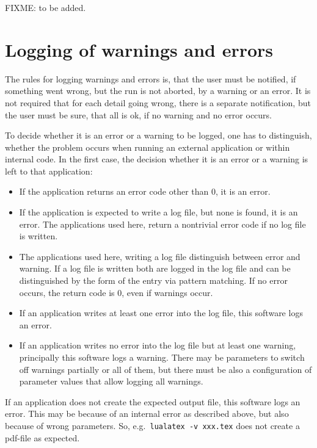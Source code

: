   



FIXME\@: to be added. 


\section{Logging of warnings and errors}\label{sec:logWarnErr}

The rules for logging warnings and errors is, 
that the user must be notified, 
if something went wrong, but the run is not aborted, 
by a warning or an error. 
It is not required that for each detail going wrong, 
there is a separate notification, 
but the user must be sure, that all is ok, 
if no warning and no error occurs. 

To decide whether it is an error or a warning to be logged, 
one has to distinguish, 
whether the problem occurs when running an external application 
or within internal code. 
In the first case, the decision whether it is an error or a warning 
is left to that application: 
%
\begin{itemize}
\item 
If the application returns an error code other than 0, 
it is an error. 
\item
If the application is expected to write a log file, 
but none is found, it is an error. 
The applications used here, 
return a nontrivial error code if no log file is written. 
\item
The applications used here, writing a log file 
distinguish between error and warning. 
If a log file is written both are logged in the log file 
and can be distinguished by the form of the entry via pattern matching. 
If no error occurs, the return code is 0, even if warnings occur. 
\item
If an application writes at least one error into the log file, 
this software logs an error. 
\item
If an application writes no error into the log file 
but at least one warning, principally this software logs a warning. 
There may be parameters to switch off warnings partially 
or all of them, 
but there must be also a configuration of parameter values 
that allow logging all warnings. 
\end{itemize}

If an application does not create the expected output file, 
this software logs an error. 
This may be because of an internal error as described above, 
but also because of wrong parameters. 
So, 
e.g.~\texttt{lualatex -v xxx.tex} 
does not create a pdf-file as expected. 


